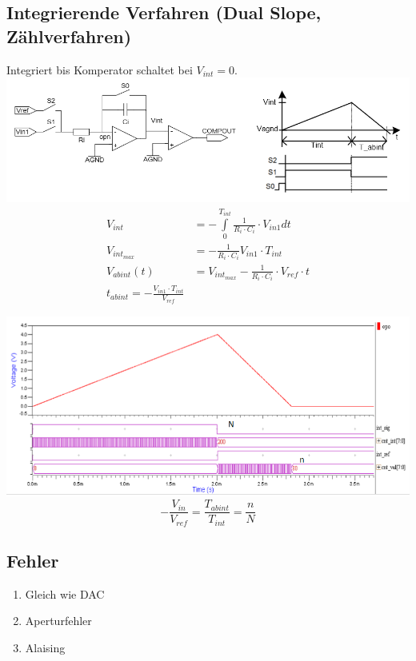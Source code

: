 \subsection{Integrierende Verfahren (Dual Slope, Zählverfahren)}
Integriert bis Komperator schaltet bei $V_{int} = 0$.\\
\includegraphics[width=\columnwidth]{Images/dual_slop_adc}
\begin{align*}
	V_{int} &= -\int\limits_{0}^{T_{int}}\frac{1}{R_i \cdot C_i}\cdot V_{in1} dt \\
	V_{int_{max}} &= -\frac{1}{R_i \cdot C_i}V_{in1}\cdot T_{int}\\
	V_{abint}(t) &= V_{int_{max}} - \frac{1}{R_i \cdot C_i}\cdot V_{ref} \cdot t \\
	t_{abint} = -\frac{V_{in1}\cdot T_{int}}{V_{ref}}
\end{align*}

\includegraphics[width=\columnwidth]{Images/dual_slop_adc1}
\[
-\frac{V_{in}}{V_{ref}} = \frac{T_{abint}}{T_{int}} = \frac{n}{N}
\]
\subsection{Fehler}
\begin{enumerate}[nosep]
	\item Gleich wie DAC
	\item Aperturfehler
	\item Alaising
\end{enumerate}